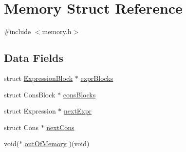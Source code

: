 \hypertarget{structMemory}{\section{Memory Struct Reference}
\label{structMemory}
}


{\ttfamily \#include $<$memory.\+h$>$}

\subsection*{Data Fields}
\begin{DoxyCompactItemize}
\item 
struct \hyperlink{structExpressionBlock}{Expression\+Block} $\ast$ \hyperlink{structMemory_acd214ac287290fab899a231d5641bc63}{expr\+Blocks}
\item 
struct Cons\+Block $\ast$ \hyperlink{structMemory_a6dd8fb1f5dec075eb20903d54642b877}{cons\+Blocks}
\item 
struct Expression $\ast$ \hyperlink{structMemory_a588f224743248c7c430727d03aeb63f4}{next\+Expr}
\item 
struct Cons $\ast$ \hyperlink{structMemory_ad2a150f5cb9c96d7b9323e50db5a921b}{next\+Cons}
\item 
void($\ast$ \hyperlink{structMemory_ae4cdcc4cf5b157966779200389abd292}{out\+Of\+Memory} )(void)
\end{DoxyCompactItemize}


